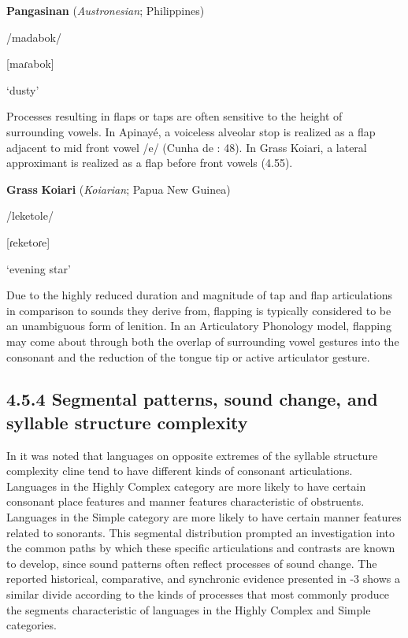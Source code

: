 \ea\label{ex:(4.54)}
  \textbf{Pangasinan} (\textit{Austronesian}; Philippines)

/madabok/

[maɾabok]

‘dusty’

\citep[18]{Benton1971}

\z

  Processes resulting in flaps or taps are often sensitive to the height of surrounding vowels. In Apinayé, a voiceless alveolar stop is realized as a flap adjacent to mid front vowel /e/ (Cunha de \citealt{Oliveira2005}: 48). In Grass Koiari, a lateral approximant is realized as a flap before front vowels (4.55).

\ea\label{ex:(4.55)}
  \textbf{Grass} \textbf{Koiari} (\textit{Koiarian}; Papua New Guinea)

/leketole/

[ɾeketoɾe]

‘evening star’

\citep[6]{Dutton1996}

\z

  Due to the highly reduced duration and magnitude of tap and flap articulations in comparison to sounds they derive from, flapping is typically considered to be an unambiguous form of lenition. In an Articulatory Phonology model, flapping may come about through both the overlap of surrounding vowel gestures into the consonant and the reduction of the tongue tip or active articulator gesture. 

\subsection{4.5.4 Segmental patterns, sound change, and syllable structure complexity}

  In  it was noted that languages on opposite extremes of the syllable structure complexity cline tend to have different kinds of consonant articulations. Languages in the Highly Complex category are more likely to have certain consonant place features and manner features characteristic of obstruents. Languages in the Simple category are more likely to have certain manner features related to sonorants. This segmental distribution prompted an investigation into the common paths by which these specific articulations and contrasts are known to develop, since sound patterns often reflect processes of sound change. The reported historical, comparative, and synchronic evidence presented in -3 shows a similar divide according to the kinds of processes that most commonly produce the segments characteristic of languages in the Highly Complex and Simple categories.

